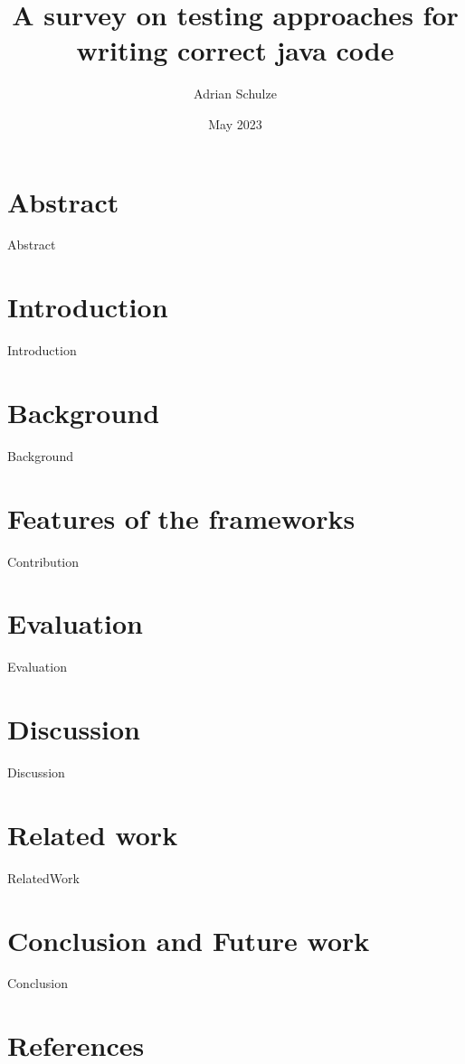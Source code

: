 \documentclass[sigconf]{acmart}
\title{A survey on testing approaches for writing correct java code}
\author{Adrian Schulze }
\date{May 2023}
\begin{document}
	
	\maketitle
	 \section{Abstract}{Abstract}
	 \section{Introduction}{Introduction}
	 \section{Background}{Background}
     \section{Features of the frameworks}{Contribution}
	 \section{Evaluation}{Evaluation}
	 \section{Discussion}{Discussion}
	 \section{Related work} {RelatedWork}
	 \section{Conclusion and Future work} {Conclusion}
	 \section{References}
	 
{}

\end{document}
